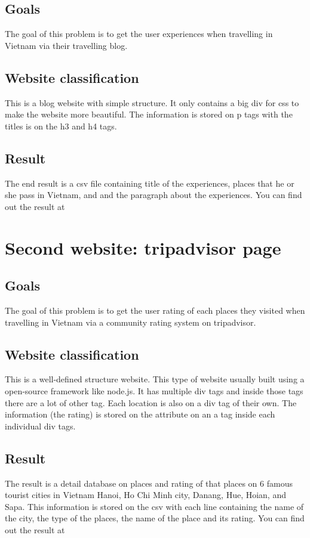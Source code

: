 \documentclass[11pt,a4paper]{report}
\begin{document}
	\subsection{Goals}
	The goal of this problem is to get the user experiences when travelling in Vietnam via their travelling blog.
	\subsection{Website classification}
	This is a blog website with simple structure. It only contains a big div for css to make the website more beautiful. The information is stored on p tags with the titles is on the h3 and h4 tags.
	\subsection{Result}
	The end result is a csv file containing title of the experiences, places that he or she pass in Vietnam, and and the paragraph about the experiences. You can find out the result at
\section{Second website: tripadvisor page}
	\subsection{Goals}
	The goal of this problem is to get the user rating of each places they visited when travelling in Vietnam via a community rating system on tripadvisor.
	\subsection{Website classification}
	This is a well-defined structure website. This type of website usually built using a open-source framework like node.js. It has multiple div tags and inside those tags there are a lot of other tag. Each location is also on a div tag of their own. The information (the rating) is stored on the attribute on an a tag inside each individual div tags.
	\subsection{Result}
	The result is a detail database on places and rating of that places on 6 famous tourist cities in Vietnam Hanoi, Ho Chi Minh city, Danang, Hue, Hoian, and Sapa. This information is stored on the csv with each line containing the name of the city, the type of the places, the name of the place and its rating. You can find out the result at
\end{document}
